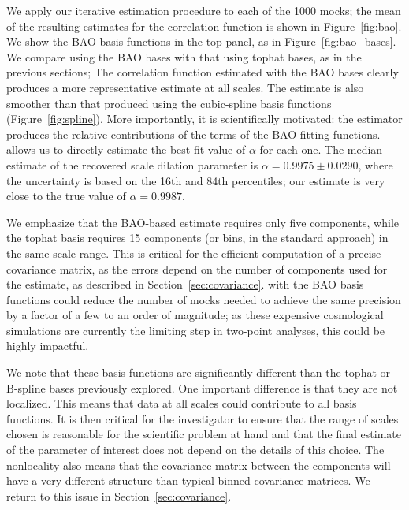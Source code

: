 We apply our iterative estimation procedure to each of the 1000 mocks; the mean of the resulting estimates for the correlation function is shown in Figure~\ref{fig:bao}.
We show the BAO basis functions in the top panel, as in Figure~\ref{fig:bao_bases}.
We compare \est using the BAO bases with that using tophat bases, as in the previous sections; 
The correlation function estimated with the BAO bases clearly produces a more representative estimate at all scales.
The estimate is also smoother than that produced using the cubic-spline basis functions (Figure~\ref{fig:spline}).
More importantly, it is scientifically motivated: the estimator produces the relative contributions of the terms of the BAO fitting functions.
 allows us to directly estimate the best-fit value of $\alpha$ for each one.
The median estimate of the recovered scale dilation parameter is $\alpha=0.9975 \pm 0.0290$, where the uncertainty is based on the 16th and 84th percentiles; our estimate is very close to the true value of $\alpha = 0.9987$.

We emphasize that the BAO-based estimate requires only five components, while the tophat basis requires 15 components (or bins, in the standard approach) in the same scale range.
This is critical for the efficient computation of a precise covariance matrix, as the errors depend on the number of components used for the estimate, as described in Section~\ref{sec:covariance}.
\Est with the BAO basis functions could reduce the number of mocks needed to achieve the same precision by a factor of a few to an order of magnitude; as these expensive cosmological simulations are currently the limiting step in two-point analyses, this could be highly impactful.

We note that these basis functions are significantly different than the tophat or B-spline bases previously explored.
One important difference is that they are not localized.
This means that data at all scales could contribute to all basis functions.
It is then critical for the investigator to ensure that the range of scales chosen is reasonable for the scientific problem at hand and that the final estimate of the parameter of interest does not depend on the details of this choice.
The nonlocality also means that the covariance matrix between the components will have a very different structure than typical binned covariance matrices.
We return to this issue in Section~\ref{sec:covariance}.


